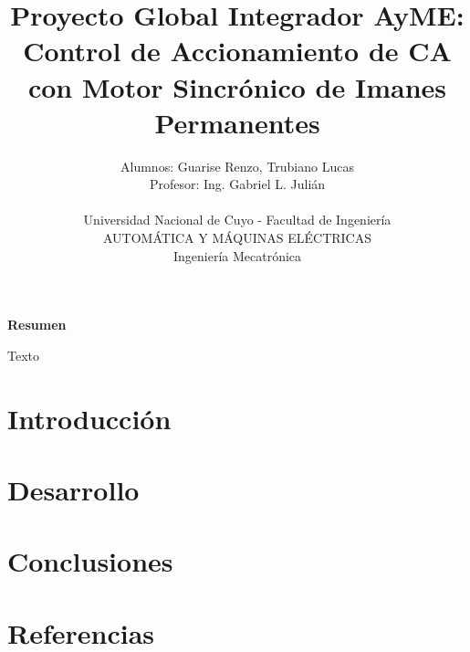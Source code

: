 \documentclass[12pt]{article}
\title{Proyecto Global Integrador AyME:\\
Control de Accionamiento de CA con Motor Sincrónico de Imanes Permanentes}
\author{Alumnos: Guarise Renzo, Trubiano Lucas\\
Profesor: Ing. Gabriel L. Julián\\
\\
Universidad Nacional de Cuyo - Facultad de Ingeniería\\
AUTOMÁTICA Y MÁQUINAS ELÉCTRICAS\\
Ingeniería Mecatrónica}
\begin{document}
\maketitle

\begin{center} %
    \textbf{Resumen}
\end{center}
\begin{Resumen}
    Texto
\end{Resumen}


\newpage

\tableofcontents %

\section{Introducción}

\section{Desarrollo}

\section{Conclusiones}

\section{Referencias}
\end{document}
